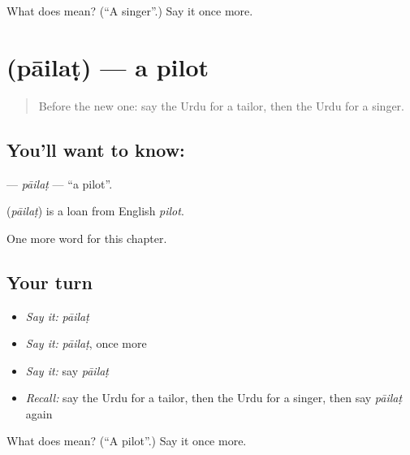 \begin{tcolorbox}[breakable,colback=teal!4,colframe=teal!35!black,title={Before you move on}]
What does  mean? (\textquotedblleft{}A singer\textquotedblright{}.) Say it once more.
\end{tcolorbox}
\section[\texorpdfstring{\ur{پائلٹ} (pāilaṭ)}{پائلٹ (pāilaṭ)}]{ (pāilaṭ) — a pilot}

\label{lesson:UR-C178-pailat}



\begin{quote}
Before the new one: say the Urdu for a tailor, then the Urdu for a singer.
\end{quote}

\subsection*{You'll want to know: }
\textbf{} — \emph{pāilaṭ} — \textquotedblleft{}a pilot\textquotedblright{}.

\begin{cousinweb}
\textbf{} (\emph{pāilaṭ}) is a loan from English \emph{pilot}.
\end{cousinweb}

\begin{grammarlens}[title={What you've built}]
One more word for this chapter.
\end{grammarlens}

\subsection*{Your turn}
\begin{itemize}
\raggedright
  \item \emph{Say it:} \emph{pāilaṭ}
  \item \emph{Say it:} \emph{pāilaṭ}, once more
  \item \emph{Say it:} say \emph{pāilaṭ}
  \item \emph{Recall:} say the Urdu for a tailor, then the Urdu for a singer, then say \emph{pāilaṭ} again
\end{itemize}

\begin{tcolorbox}[breakable,colback=teal!4,colframe=teal!35!black,title={Before you move on}]
What does  mean? (\textquotedblleft{}A pilot\textquotedblright{}.) Say it once more.
\end{tcolorbox}
